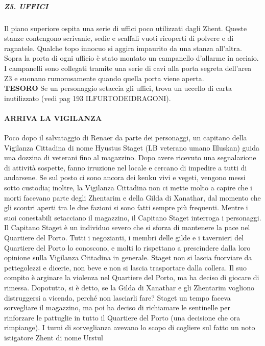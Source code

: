 \documentclass{article}
\begin{document}
                        \subparagraph{Z5. UFFICI}
Il piano superiore ospita una serie di uffici poco utilizzati
dagli Zhent. Queste stanze contengono scrivanie, sedie e
scaffali vuoti ricoperti di polvere e di ragnatele. Qualche
topo innocuo si aggira impaurito da una stanza all'altra.
Sopra la porta di ogni ufficio è stato montato un
campanello d'allarme in acciaio. I campanelli sono collegati
tramite una serie di cavi alla porta segreta dell'area Z3 e
suonano rumorosamente quando quella porta viene aperta. \\

\textbf{TESORO}
Se un personaggio setaccia gli uffici, trova un uccello di
carta inutilizzato (vedi pag 193 ILFURTODEIDRAGONI).

                \paragraph{ARRIVA LA VIGILANZA}
Poco dopo il salvataggio di Renaer da parte dei personaggi,
un capitano della Vigilanza Cittadina di nome Hyustus
Staget (LB veterano umano Illuskan) guida una dozzina
di veterani fino al magazzino. Dopo avere ricevuto una
segnalazione di attività sospette, fanno irruzione nel locale
e cercano di impedire a tutti di andarsene. Se sul posto ci
sono ancora dei kenku vivi e vegeti, vengono messi sotto
custodia; inoltre, la Vigilanza Cittadina non ci mette molto
a capire che i morti facevano parte degli Zhentarim e della
Gilda di Xanathar, dal momento che gli scontri aperti tra
le due fazioni si sono fatti sempre più frequenti. Mentre i
suoi conestabili setacciano il magazzino, il Capitano Staget
interroga i personaggi.
Il Capitano Staget è un individuo severo che si sforza
di mantenere la pace nel Quartiere del Porto. Tutti i
negozianti, i membri delle gilde e i tavernieri del Quartiere
del Porto lo conoscono, e molti lo rispettano a prescindere
dalla loro opinione sulla Vigilanza Cittadina in generale.
Staget non si lascia fuorviare da pettegolezzi e dicerie, non
beve e non si lascia trasportare dalla collera. Il suo compito
è arginare la violenza nel Quartiere del Porto, ma ha deciso
di giocare di rimessa. Dopotutto, si è detto, se la Gilda di
Xanathar e gli Zhentarim vogliono distruggersi a vicenda,
perché non lasciarli fare?
Staget un tempo faceva sorvegliare il magazzino, ma
poi ha deciso di richiamare le sentinelle per rinforzare le
pattuglie in tutto il Quartiere del Porto (una decisione che
ora rimpiange). I turni di sorveglianza avevano lo scopo di
cogliere sul fatto un noto istigatore Zhent di nome Urstul
\end{document}
